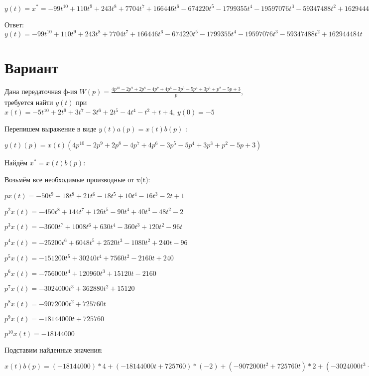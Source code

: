 \documentclass{article}
\begin{document}
{{$y(t)=x^*=-99t^{10}+110t^{9}+243t^{8}+7704t^{7}+166446t^{6}-674220t^{5}-1799355t^{4}-19597076t^{3}-59347488t^{2}+162944484t$

Ответ: $y(t) = -99t^{10}+110t^{9}+243t^{8}+7704t^{7}+166446t^{6}-674220t^{5}-1799355t^{4}-19597076t^{3}-59347488t^{2}+162944484t$

\section{Вариант}

Дана передаточная ф-ия $W(p)=\frac{4p^{10}-2p^{9}+2p^{8}-4p^{7}+4p^{6}-3p^{5}-5p^{4}+3p^{3}+p^{2}-5p+3}{p}$, требуется найти $y(t)$ при $x(t)=-5t^{10}+2t^{9}+3t^{7}-3t^{6}+2t^{5}-4t^{4}-t^{2}+t+4$, $y(0)=-5$

Перепишем выражение в виде $y(t)a(p)=x(t)b(p)$ :

$y(t)(p)=x(t)(4p^{10}-2p^{9}+2p^{8}-4p^{7}+4p^{6}-3p^{5}-5p^{4}+3p^{3}+p^{2}-5p+3)$

Найдём $x^*=x(t)b(p)$:

Возьмём все необходимые производные от x(t):

$px(t)=-50t^{9}+18t^{8}+21t^{6}-18t^{5}+10t^{4}-16t^{3}-2t+1$

$p^2x(t)=-450t^{8}+144t^{7}+126t^{5}-90t^{4}+40t^{3}-48t^{2}-2$

$p^3x(t)=-3600t^{7}+1008t^{6}+630t^{4}-360t^{3}+120t^{2}-96t$

$p^4x(t)=-25200t^{6}+6048t^{5}+2520t^{3}-1080t^{2}+240t-96$

$p^5x(t)=-151200t^{5}+30240t^{4}+7560t^{2}-2160t+240$

$p^6x(t)=-756000t^{4}+120960t^{3}+15120t-2160$

$p^7x(t)=-3024000t^{3}+362880t^{2}+15120$

$p^8x(t)=-9072000t^{2}+725760t$

$p^9x(t)=-18144000t+725760$

$p^10x(t)=-18144000$

Подставим найденные значения:

$x(t)b(p) = (-18144000)*4+(-18144000t+725760)*(-2)+(-9072000t^{2}+725760t)*2+(-3024000t^{3}+362880t^{2}+15120)*(-4)+(-756000t^{4}+120960t^{3}+15120t-2160)*4+(-151200t^{5}+30240t^{4}+7560t^{2}-2160t+240)*(-3)+(-25200t^{6}+6048t^{5}+2520t^{3}-1080t^{2}+240t-96)*(-5)+(-3600t^{7}+1008t^{6}+630t^{4}-360t^{3}+120t^{2}-96t)*3+(-450t^{8}+144t^{7}+126t^{5}-90t^{4}+40t^{3}-48t^{2}-2)*1+(-50t^{9}+18t^{8}+21t^{6}-18t^{5}+10t^{4}-16t^{3}-2t+1)*(-5)+(-50t^{9}+18t^{8}+21t^{6}-18t^{5}+10t^{4}-16t^{3}-2t+1)*3=100t^{9}-486t^{8}-10656t^{7}+128982t^{6}+423522t^{5}-3112940t^{4}+12566232t^{3}-19612488t^{2}+37804996t$





}}
\end{document}
